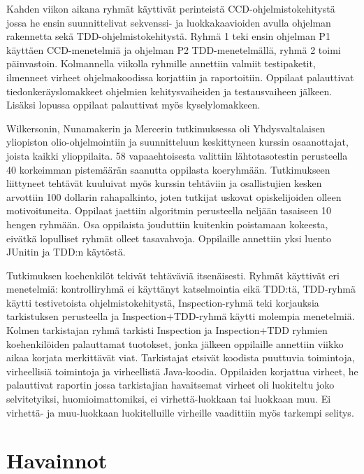 \documentclass[finnish]{tktltiki2}
\theoremstyle{definition}
\theoremstyle{remark}
\begin{document}
Kahden viikon aikana ryhmät käyttivät perinteistä CCD-ohjelmistokehitystä jossa he ensin suunnittelivat sekvenssi- ja luokkakaavioiden avulla ohjelman rakennetta sekä TDD-ohjelmistokehitystä. Ryhmä 1 teki ensin ohjelman P1 käyttäen CCD-menetelmiä ja ohjelman P2 TDD-menetelmällä, ryhmä 2 toimi päinvastoin. Kolmannella viikolla ryhmille annettiin valmiit testipaketit, ilmenneet virheet ohjelmakoodissa korjattiin ja raportoitiin. Oppilaat palauttivat tiedonkeräyslomakkeet ohjelmien kehitysvaiheiden ja testausvaiheen jälkeen. Lisäksi lopussa oppilaat palauttivat myös kyselylomakkeen.

Wilkersonin, Nunamakerin ja Mercerin tutkimuksessa oli Yhdysvaltalaisen yliopiston olio-ohjelmointiin ja suunnitteluun keskittyneen kurssin osaanottajat, joista kaikki ylioppilaita. 58 vapaaehtoisesta valittiin lähtotasotestin perusteella 40 korkeimman pistemäärän saanutta oppilasta koeryhmään. Tutkimukseen liittyneet tehtävät kuuluivat myös kurssin tehtäviin ja osallistujien kesken arvottiin 100 dollarin rahapalkinto, joten tutkijat uskovat opiskelijoiden olleen motivoituneita. Oppilaat jaettiin algoritmin perusteella neljään tasaiseen 10 hengen ryhmään. Osa oppilaista jouduttiin kuitenkin poistamaan kokeesta, eivätkä lopulliset ryhmät olleet tasavahvoja.  Oppilaille annettiin yksi luento JUnitin ja TDD:n käytöstä.

Tutkimuksen koehenkilöt tekivät tehtäväviä itsenäisesti. Ryhmät käyttivät eri menetelmiä: kontrolliryhmä ei käyttänyt katselmointia eikä TDD:tä, TDD-ryhmä käytti testivetoista ohjelmistokehitystä, Inspection-ryhmä teki korjauksia tarkistuksen perusteella ja Inspection+TDD-ryhmä käytti molempia menetelmiä. Kolmen tarkistajan ryhmä tarkisti Inspection ja Inspection+TDD ryhmien koehenkilöiden palauttamat tuotokset, jonka jälkeen oppilaille annettiin viikko aikaa korjata merkittävät viat. Tarkistajat etsivät koodista puuttuvia toimintoja, virheellisiä toimintoja ja virheellistä Java-koodia. Oppilaiden korjattua virheet, he palauttivat raportin jossa tarkistajian havaitsemat virheet oli luokiteltu joko selvitetyiksi, huomioimattomiksi, ei virhettä-luokkaan tai luokkaan muu. Ei virhettä- ja muu-luokkaan luokitelluille virheille vaadittiin myös tarkempi selitys.





\section*{Havainnot}
\end{document}
